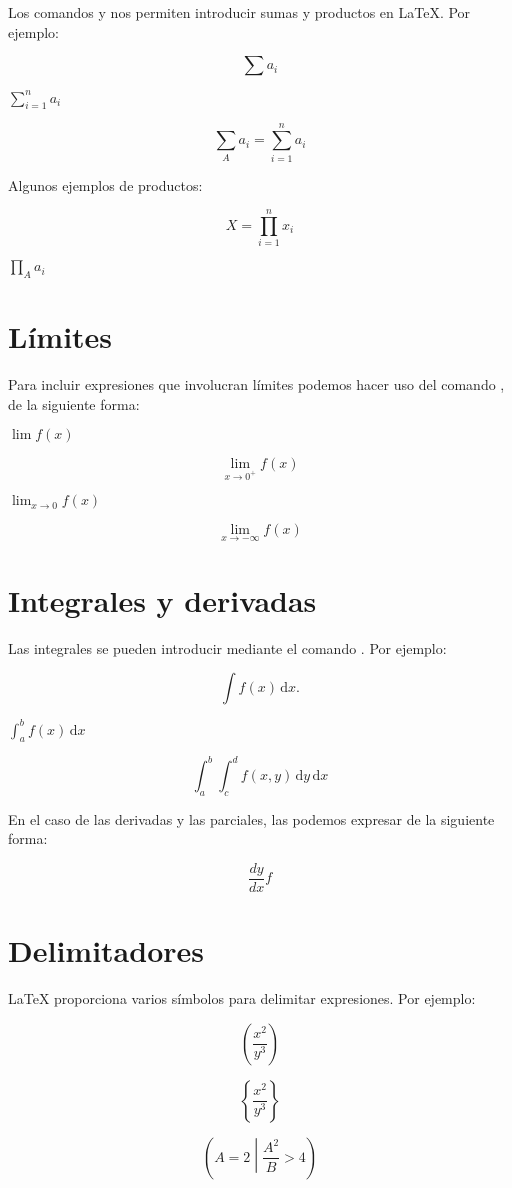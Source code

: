 \documentclass[letterpaper,12pt]{article}
\begin{document}
Los comandos \verb@\sum@ y \verb@prod@ nos permiten introducir sumas y productos en \LaTeX{}. Por ejemplo:

$$\sum a_i$$

$\displaystyle \sum_{i=1}^n a_i$

$$\sum_{A} a_i = \sum_{i=1}^n a_i $$

Algunos ejemplos de productos:

$$X= \prod_{i=1}^n x_i$$

$\displaystyle \prod_{A} a_i$

\section{Límites}

Para incluir expresiones que involucran límites podemos hacer uso del comando \verb@\lim@, de la siguiente forma:

$\displaystyle \lim f(x)$

\[ \lim_{x \rightarrow 0^{+}} f(x) \]

$\displaystyle \lim_{x\to 0} f(x) $

\[ \lim_{x \to -\infty} f(x) \]

\section{Integrales y derivadas}

Las integrales se pueden introducir mediante el comando \verb@\int@. Por ejemplo:

$$\int \! f(x) \, \mathrm{d}x. $$

$\displaystyle \int_a^b f(x) \, \mathrm{d}x $

\[ \int_a^b \int_c^d {f(x,y) \, \mathrm{d}y} \, \mathrm{d}x \]

En el caso de las derivadas y las parciales, las podemos expresar de la siguiente forma:

$$\frac{dy}{dx} f$$

\section{Delimitadores}

\LaTeX{} proporciona varios símbolos para delimitar expresiones. Por ejemplo:

$$ \left( \frac{x^2}{y^3} \right) $$

\[ \left\{ \frac{x^2}{y^3} \right\} \]

\[ \left( A=2 \middle| \frac{A^2}{B}>4 \right) \]
\end{document}
